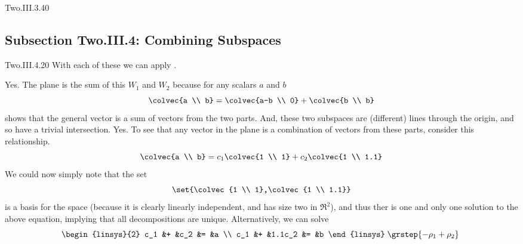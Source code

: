 \begin{ans}{Two.III.3.40}
\end{ans}
\subsection{Subsection Two.III.4: Combining Subspaces}
\begin{ans}{Two.III.4.20}
       With each of these we can apply .
       \begin{exparts}
         \partsitem Yes.
           The plane is the sum of this $W_1$ and $W_2$ because for any
           scalars $a$ and $b$
           \begin{equation*}
             \colvec{a \\ b}
             =\colvec{a-b \\ 0}
             +\colvec{b \\ b}
           \end{equation*}
           shows that the general vector is a sum of vectors from the two
           parts.
           And, these two subspaces are (different) lines through the origin,
           and so have a trivial intersection.
         \partsitem Yes.
           To see that any vector in the plane is a combination of vectors
           from these parts, consider this relationship.
           \begin{equation*}
             \colvec{a \\ b}=c_1\colvec{1 \\ 1}+c_2\colvec{1 \\ 1.1}
           \end{equation*}
           We could now simply note that the set
           \begin{equation*}
             \set{\colvec{1 \\ 1},\colvec{1 \\ 1.1}}
           \end{equation*}
           is a basis for the space (because it is clearly linearly
           independent, and has size two in $\Re^2$), and thus ther is one and
           only one solution to the above equation, implying that all
           decompositions are unique.
           Alternatively, we can solve
           \begin{equation*}
             \begin{linsys}{2}
               c_1  &+  &c_2    &=  &a  \\
               c_1  &+  &1.1c_2 &=  &b
             \end{linsys}
             \;\grstep{-\rho_1+\rho_2}\;

\end{equation*}
\end{exparts}
\end{ans}
